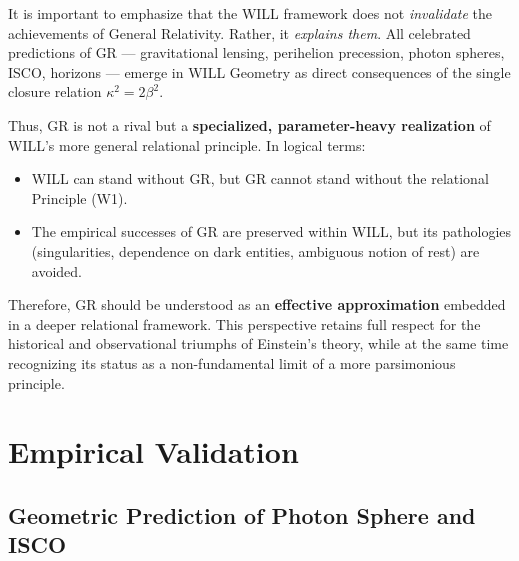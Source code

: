 \documentclass[12pt, a4paper]{article}
\begin{document}
\begin{tcolorbox}[colback=gray!4,colframe=black!70!black,title=\textbf{Status of General Relativity within WILL}]
It is important to emphasize that the WILL framework does not \emph{invalidate} the achievements of General Relativity. 
Rather, it \emph{explains them}. All celebrated predictions of GR --- 
gravitational lensing, perihelion precession, photon spheres, ISCO, horizons --- 
emerge in WILL Geometry as direct consequences of the single closure relation 
$\kappa^2 = 2\beta^2$. 

Thus, GR is not a rival but a \textbf{specialized, parameter-heavy realization} of 
WILL's more general relational principle. In logical terms: 
\begin{itemize}
    \item WILL can stand without GR, but GR cannot stand without the relational Principle (W1). 
    \item The empirical successes of GR are preserved within WILL, but its pathologies 
    (singularities, dependence on dark entities, ambiguous notion of rest) are avoided. 
\end{itemize}

Therefore, GR should be understood as an \textbf{effective approximation} embedded in 
a deeper relational framework. This perspective retains full respect for the historical 
and observational triumphs of Einstein's theory, while at the same time recognizing its 
status as a non-fundamental limit of a more parsimonious principle.
\end{tcolorbox}

\section{Empirical Validation}


\subsection{Geometric Prediction of Photon Sphere and ISCO}
\end{document}
